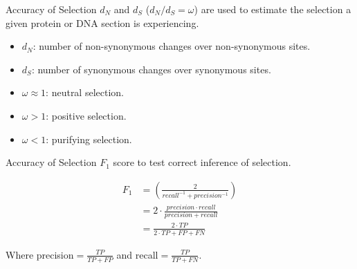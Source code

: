 \documentclass[aspectratio=169]{beamer}
\begin{document}
\begin{frame}[noframenumbering]{Accuracy of Selection} %
$d_N$ and $d_S$ ($d_N/d_S = \omega$) are used to estimate the selection a given protein or DNA
section is experiencing.

\vspace{1em}
\begin{itemize}
	\item $d_N$: number of non-synonymous changes over non-synonymous sites.
	\item $d_S$: number of synonymous changes over synonymous sites.
	\item $\omega \approx 1$: neutral selection.
	\item $\omega > 1$: positive selection.
	\item $\omega < 1$: purifying selection.
\end{itemize}
\end{frame} %

\begin{frame}[noframenumbering]{Accuracy of Selection} %
$F_1$ score to test correct inference of selection.

\begin{align*}
F_1 &= \left( \frac{2}{recall^{-1} + precision^{-1}} \right)\\
	&= 2 \cdot \frac{precision \cdot recall}{precision + recall}\\
	&= \frac{2 \cdot TP}{2 \cdot TP+FP+FN}
\end{align*}

\vspace{1em}
Where precision$=\frac{TP}{TP+FP}$ and recall$=\frac{TP}{TP+FN}$.
\end{frame} %

\end{document}
